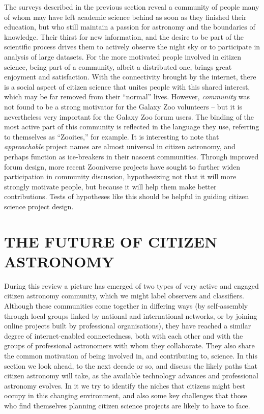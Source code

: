 \documentclass{ar2e}
\begin{document}
The surveys described in the previous section reveal a community of people many
of whom may have left academic science behind as soon as they finished their 
education, but who still maintain a passion for astronomy and the boundaries of
knowledge.  Their thirst for new information, and the  desire to be part of the 
scientific process drives them to actively observe the  night sky or to
participate in analysis of large datasets.  For the more motivated people
involved in citizen science, being part of a community,  albeit a distributed
one, brings great enjoyment and satisfaction.  With the connectivity brought by
the internet, there is a social  aspect of citizen science that unites people
with this shared interest, which may be far removed from their ``normal'' 
lives. However, {\it community} was not found to be a strong motivator for the
Galaxy Zoo volunteers -- but it is nevertheless very important for the Galaxy
Zoo forum users.
The binding of the most active part of this community  is reflected in the
language they use,  referring to themselves as ``Zooites,'' for example.  It is
interesting to note that \textit{approachable} project names are almost 
universal in citizen astronomy, and perhaps function as ice-breakers in their
nascent communities. Through improved forum design, more recent Zooniverse
projects have sought to further widen participation in community discussion,
hypothesizing not that it will more strongly motivate people, but because it
will help them make better contributions. Tests of hypotheses like this should
be helpful in guiding citizen science project design.



\section{THE FUTURE OF CITIZEN ASTRONOMY}
\label{sec:future}


During this review a picture has emerged of two types of very active and engaged
citizen astronomy community, which we might label observers and classifiers. 
Although these communities come together in differing ways (by self-assembly
through local groups linked by national and international networks, or by
joining online projects built by professional organisations), they have reached
a similar degree of internet-enabled connectedness, both with each other and
with the groups of professional astronomers with whom they  collaborate. They
also share the common motivation of being involved in, and contributing to,
science. In this section we look ahead, to the next decade or so, and discuss
the likely paths that citizen astronomy will take, as the available technology
advances and professional astronomy evolves. In it we try to identify the niches
that citizens might best occupy in this changing environment, and also some key
challenges that those who find themselves planning citizen science projects are
likely to have to face.
\end{document}
